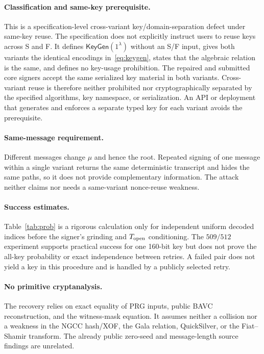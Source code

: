 \documentclass[11pt,a4paper]{article}
\newcommand{\KeyGen}{\mathsf{KeyGen}}
\begin{document}
\paragraph{Classification and same-key prerequisite.}
This is a specification-level cross-variant key/domain-separation defect under
same-key reuse.  The specification does not explicitly instruct users to reuse
keys across S and F.  It defines $\KeyGen(1^\lambda)$ without an S/F input, gives
both variants the identical encodings in~\eqref{eq:keygen}, states that the
algebraic relation is the same, and defines no key-usage prohibition.  The
repaired and submitted core signers accept the same serialized key material in
both variants.  Cross-variant reuse is therefore neither prohibited nor
cryptographically separated by the specified algorithms, key namespace, or
serialization.  An API or deployment that generates and enforces a separate
typed key for each variant avoids the prerequisite.

\paragraph{Same-message requirement.}
Different messages change $\mu$ and hence the root.  Repeated signing of one
message within a single variant returns the same deterministic transcript and
hides the same paths, so it does not provide complementary information.  The
attack neither claims nor needs a same-variant nonce-reuse weakness.

\paragraph{Success estimates.}
Table~\ref{tab:prob} is a rigorous calculation only for independent uniform
decoded indices before the signer's grinding and $T_{\rm open}$ conditioning.
The $509/512$ experiment supports practical success for one 160-bit key but does
not prove the all-key probability or exact independence between retries.  A failed
pair does not yield a key in this procedure and is handled by a publicly selected
retry.

\paragraph{No primitive cryptanalysis.}
The recovery relies on exact equality of PRG inputs, public BAVC reconstruction,
and the witness-mask equation.  It assumes neither a collision nor a weakness in
the NGCC hash/XOF, the Gala relation, QuickSilver, or the Fiat--Shamir transform.
The already public zero-seed and message-length source findings are unrelated.
\end{document}
